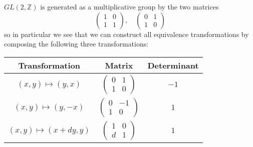 \documentclass[12pt]{article}
\newcommand{\BZ}{\mathbb{Z}}
\theoremstyle{definition}
\begin{document}
$GL(2,\BZ)$ is generated as a multiplicative group by the two matrices
\[\begin{pmatrix}1&0\\1&1\end{pmatrix},\quad\begin{pmatrix}0&1\\1&0\end{pmatrix}\]
so in particular we see that we can construct all equivalence transformations by composing the following three transformations:
\begin{center}
\begin{tabular}{c|c|c}
Transformation & Matrix & Determinant\\
	\hline
$(x,y)\mapsto(y,x)$ & $\left(\begin{array}{cc}0&1\\1&0\end{array}\right)$ & $-1$\\[1.5em]
$(x,y)\mapsto(y,-x)$ & $\left(\begin{array}{cc}0&-1\\1&0\end{array}\right)$ & $1$\\[1.5em]
$(x,y)\mapsto(x+dy,y)$ & $\left(\begin{array}{cc}1&0\\d&1\end{array}\right)$ & $1$
\end{tabular}
\end{center}
\end{document}
